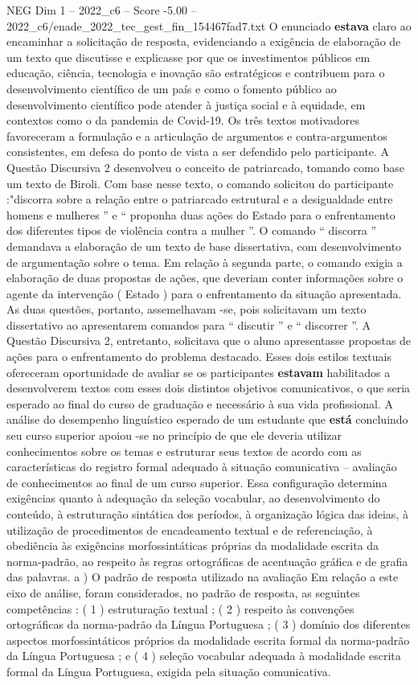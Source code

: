 \begin{textsample}{NEG Dim 1 – 2022\_c6 – Score -5.00 – 2022\_c6/enade\_2022\_tec\_gest\_fin\_154467fad7.txt}
O enunciado \textbf{estava} claro ao encaminhar a solicitação de resposta, evidenciando a exigência de elaboração de um texto que discutisse e explicasse por que os investimentos públicos em educação, ciência, tecnologia e inovação são estratégicos e contribuem para o desenvolvimento científico de um país e como o fomento público ao desenvolvimento científico pode atender à justiça social e à equidade, em contextos como o da pandemia de Covid-19.
Os três textos motivadores favoreceram a formulação e a articulação de argumentos e contra-argumentos consistentes, em defesa do ponto de vista a ser defendido pelo participante.
A Questão Discursiva 2 desenvolveu o conceito de patriarcado, tomando como base um texto de Biroli.
Com base nesse texto, o comando solicitou do participante :"discorra sobre a relação entre o patriarcado estrutural e a desigualdade entre homens e mulheres ” e “ proponha duas ações do Estado para o enfrentamento dos diferentes tipos de violência contra a mulher ”.
O comando “ discorra ” demandava a elaboração de um texto de base dissertativa, com desenvolvimento de argumentação sobre o tema.
Em relação à segunda parte, o comando exigia a elaboração de duas propostas de ações, que deveriam conter informações sobre o agente da intervenção ( Estado ) para o enfrentamento da situação apresentada.
As duas questões, portanto, assemelhavam -se, pois solicitavam um texto dissertativo ao apresentarem comandos para “ discutir ” e “ discorrer ”.
A Questão Discursiva 2, entretanto, solicitava que o aluno apresentasse propostas de ações para o enfrentamento do problema destacado.
Esses dois estilos textuais ofereceram oportunidade de avaliar se os participantes \textbf{estavam} habilitados a desenvolverem textos com esses dois distintos objetivos comunicativos, o que seria esperado ao final do curso de graduação e necessário à sua vida profissional.
A análise do desempenho linguístico esperado de um estudante que \textbf{está} concluindo seu curso superior apoiou -se no princípio de que ele deveria utilizar conhecimentos sobre os temas e estruturar seus textos de acordo com as características do registro formal adequado à situação comunicativa – avaliação de conhecimentos ao final de um curso superior.
Essa configuração determina exigências quanto à adequação da seleção vocabular, ao desenvolvimento do conteúdo, à estruturação sintática dos períodos, à organização lógica das ideias, à utilização de procedimentos de encadeamento textual e de referenciação, à obediência às exigências morfossintáticas próprias da modalidade escrita da norma-padrão, ao respeito às regras ortográficas de acentuação gráfica e de grafia das palavras. a ) O padrão de resposta utilizado na avaliação Em relação a este eixo de análise, foram considerados, no padrão de resposta, as seguintes competências : ( 1 ) estruturação textual ; ( 2 ) respeito às convenções ortográficas da norma-padrão da Língua Portuguesa ; ( 3 ) domínio dos diferentes aspectos morfossintáticos próprios da modalidade escrita formal da norma-padrão da Língua Portuguesa ; e ( 4 ) seleção vocabular adequada à modalidade escrita formal da Língua Portuguesa, exigida pela situação comunicativa.

\end{textsample}
